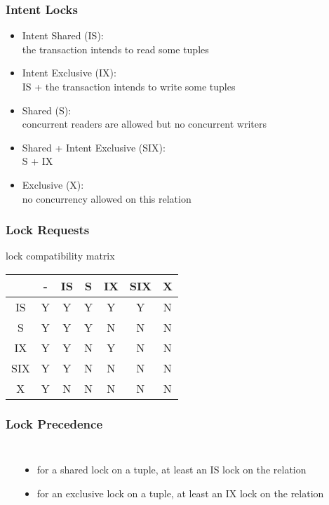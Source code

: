 \documentclass[dvipsnames]{beamer}
\theoremstyle{plain}
\begin{document}
\begin{frame}
  \frametitle{Intent Locks}

  \begin{itemize}
    \item Intent Shared (IS):\\
      the transaction intends to read some tuples

    \pause
    \item Intent Exclusive (IX):\\
      IS + the transaction intends to write some tuples

    \pause
    \item Shared (S):\\
      concurrent readers are allowed but no concurrent writers

    \pause
    \item Shared + Intent Exclusive (SIX):\\
      S + IX

    \pause
    \item Exclusive (X):\\
      no concurrency allowed on this relation
  \end{itemize}
\end{frame}

\begin{frame}
  \frametitle{Lock Requests}

  \begin{block}{lock compatibility matrix}
    \begin{table}
      \begin{tabular}{|c||c|c|c|c|c|c|}\hline
    & - & IS & S & IX & SIX & X\\\hline\hline
 IS & Y & Y  & Y & Y  &  Y  & N\\\hline
  S & Y & Y  & Y & N  &  N  & N\\\hline
 IX & Y & Y  & N & Y  &  N  & N\\\hline
SIX & Y & Y  & N & N  &  N  & N\\\hline
  X & Y & N  & N & N  &  N  & N\\\hline
      \end{tabular}
    \end{table}
  \end{block}
\end{frame}

\begin{frame}
  \frametitle{Lock Precedence}

  \begin{columns}[t]
    \begin{center}
    \end{center}

    \pause
    \begin{itemize}
      \item for a shared lock on a tuple, at least an IS lock on the relation
      \item for an exclusive lock on a tuple, at least an IX lock on the
        relation
    \end{itemize}
  \end{columns}
\end{frame}
\end{document}
